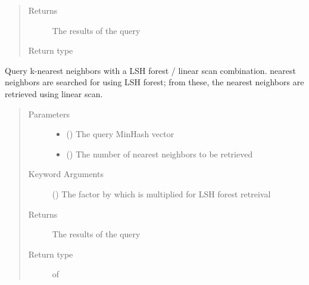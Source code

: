 \documentclass[letterpaper,10pt,english]{sphinxmanual}
\begin{document}
\begin{fulllineitems}
\begin{fulllineitems}
\begin{quote}
\begin{description}
\item[{Returns}] \leavevmode
The results of the query

\item[{Return type}] \leavevmode
{}

\end{description}\end{quote}

\end{fulllineitems}


\begin{fulllineitems}
\label{\detokenize{documentation:tmap.LSHForest.query_linear_scan}}
Query k-nearest neighbors with a LSH forest / linear scan combination.  nearest neighbors are searched for using LSH forest; from these, the  nearest neighbors are retrieved using linear scan.
\begin{quote}\begin{description}
\item[{Parameters}] \leavevmode\begin{itemize}
\item {} 
 () \textendash{} The query MinHash vector

\item {} 
 () \textendash{} The number of nearest neighbors to be retrieved

\end{itemize}

\item[{Keyword Arguments}] \leavevmode
{} () \textendash{} The factor by which  is multiplied for LSH forest retreival

\item[{Returns}] \leavevmode
The results of the query

\item[{Return type}] \leavevmode
{} of 


\end{description}
\end{quote}
\end{fulllineitems}
\end{fulllineitems}
\end{document}

